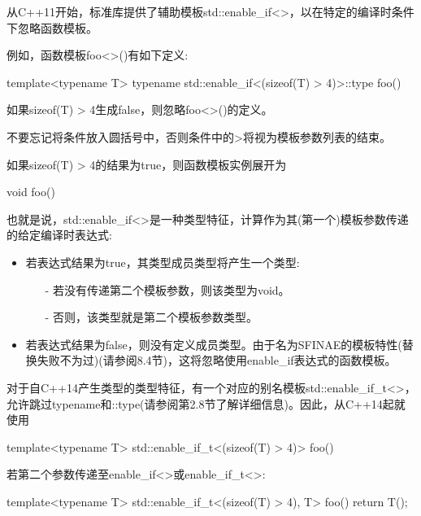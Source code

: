 从C++11开始，标准库提供了辅助模板std::enable\_if<>，以在特定的编译时条件下忽略函数模板。

例如，函数模板foo<>()有如下定义:

\begin{cpp}
template<typename T>
typename std::enable_if<(sizeof(T) > 4)>::type
foo() {
}
\end{cpp}

如果sizeof(T) > 4生成false，则忽略foo<>()的定义。

\begin{notice}不要忘记将条件放入圆括号中，否则条件中的>将视为模板参数列表的结束。
\end{notice}

如果sizeof(T) > 4的结果为true，则函数模板实例展开为

\begin{cpp}
void foo() {
}
\end{cpp}

也就是说，std::enable\_if<>是一种类型特征，计算作为其(第一个)模板参数传递的给定编译时表达式:

\begin{itemize}
\item 
若表达式结果为true，其类型成员类型将产生一个类型:

\begin{itemize}
\item[-]
若没有传递第二个模板参数，则该类型为void。
	
\item[-]
否则，该类型就是第二个模板参数类型。
\end{itemize}

\item 
若表达式结果为false，则没有定义成员类型。由于名为SFINAE的模板特性(替换失败不为过)(请参阅8.4节)，这将忽略使用enable\_if表达式的函数模板。
\end{itemize}

对于自C++14产生类型的类型特征，有一个对应的别名模板std::enable\_if\_t<>，允许跳过typename和::type(请参阅第2.8节了解详细信息)。因此，从C++14起就使用

\begin{cpp}
template<typename T>
std::enable_if_t<(sizeof(T) > 4)>
foo() {
}
\end{cpp}

若第二个参数传递至enable\_if<>或enable\_if\_t<>:

\begin{cpp}
template<typename T>
std::enable_if_t<(sizeof(T) > 4), T>
foo() {
	return T();
}
\end{cpp}


